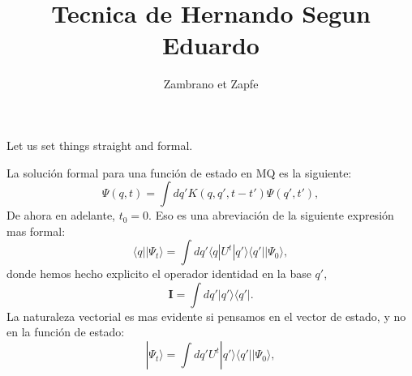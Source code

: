 \documentclass[a4paper,12pt]{article}
\title{Tecnica de Hernando Segun Eduardo}
\author{Zambrano et Zapfe}
\newcommand{\Ifase}{\mathbf{I}}
\newcommand{\bra}[1]{\langle #1|}
\newcommand{\ket}[1]{|#1\rangle}
\begin{document}
Let us set things straight and formal.

La solución formal para una función de estado en MQ es la siguiente:
\begin{equation}
\Psi(q,t)=\int dq' K(q,q', t-t') \Psi(q',t'),
\end{equation}
De ahora en adelante,  $t_0=0$.
Eso es una abreviación de la siguiente expresión mas formal:
\begin{equation}\label{evolbien}
\bra{q}\ket{\Psi_t}=\int dq' \bra{q}U^t\ket{q'}\bra{q'}\ket{\Psi_0},
\end{equation}
donde hemos hecho explicito el operador identidad en la base $q'$, 
\begin{equation}
\Ifase=\int dq' \ket{q'}\bra{q'}.
\end{equation}
La naturaleza vectorial es mas evidente si pensamos en el vector de
estado, y no en la función de estado:
\begin{equation}
\ket{\Psi_t}=\int dq' U^t\ket{q'}\bra{q'}\ket{\Psi_0},
\end{equation}
\end{document}
